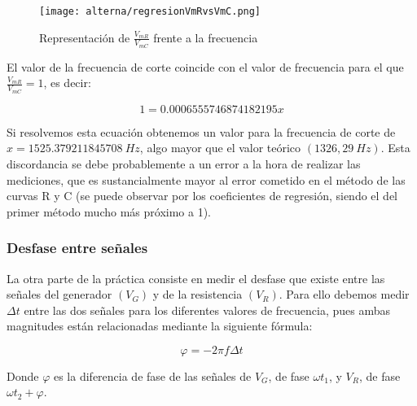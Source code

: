 \documentclass[a4paper,12pt,titlepage]{article}
\begin{document}
\begin{figure}[h]
    \centering
    \texttt{[image: alterna/regresionVmRvsVmC.png]}
    \caption{Representación de $\frac{V_{mR}}{V_{mC}}$ frente a la frecuencia}
    \label{Vmr/Vmc}
\end{figure}

 El valor de la frecuencia de corte coincide con el valor de frecuencia para el que $\frac{V_{mR}}{V_{mC}}=1$, es decir:

 \begin{equation}
     1=0.0006555746874182195x
 \end{equation}

 Si resolvemos esta ecuación obtenemos un valor para la frecuencia de corte de $x = 1525.379211845708\: Hz$, algo mayor que el valor teórico $(1326,29\: Hz)$. Esta discordancia se debe probablemente a un error a la hora de realizar las mediciones, que es sustancialmente mayor al error cometido en el método de las curvas R y C (se puede observar por los coeficientes de regresión, siendo el del primer método mucho más próximo a 1).

\newpage

 \subsubsection{Desfase entre señales}
La otra parte de la práctica consiste en medir el desfase que existe entre las señales del generador $(V_{G})$ y de la resistencia $(V_{R})$. Para ello debemos medir $\Delta t$ entre las dos señales para los diferentes valores de frecuencia, pues ambas magnitudes están relacionadas mediante la siguiente fórmula:

\begin{equation}
    \varphi=-2\pi f\Delta t
\end{equation}

Donde $\varphi$ es la diferencia de fase de las señales de $V_{G}$, de fase $\omega t_{1}$, y $V_{R}$, de fase $\omega t_{2}+\varphi$.
\end{document}
